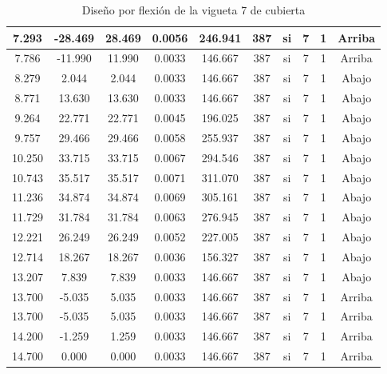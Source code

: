 \begin{table}[H]
{\begin{tabular}{|c|c|c|c|c|c|c|c|c|c|}
    \hline
    7.293 & -28.469 & 28.469 & 0.0056 & 246.941 & 387 & si  & 7   & 1   & Arriba \bigstrut\\
    \hline
    7.786 & -11.990 & 11.990 & 0.0033 & 146.667 & 387 & si  & 7   & 1   & Arriba \bigstrut\\
    \hline
    8.279 & 2.044 & 2.044 & 0.0033 & 146.667 & 387 & si  & 7   & 1   & Abajo \bigstrut\\
    \hline
    8.771 & 13.630 & 13.630 & 0.0033 & 146.667 & 387 & si  & 7   & 1   & Abajo \bigstrut\\
    \hline
    9.264 & 22.771 & 22.771 & 0.0045 & 196.025 & 387 & si  & 7   & 1   & Abajo \bigstrut\\
    \hline
    9.757 & 29.466 & 29.466 & 0.0058 & 255.937 & 387 & si  & 7   & 1   & Abajo \bigstrut\\
    \hline
    10.250 & 33.715 & 33.715 & 0.0067 & 294.546 & 387 & si  & 7   & 1   & Abajo \bigstrut\\
    \hline
    10.743 & 35.517 & 35.517 & 0.0071 & 311.070 & 387 & si  & 7   & 1   & Abajo \bigstrut\\
    \hline
    11.236 & 34.874 & 34.874 & 0.0069 & 305.161 & 387 & si  & 7   & 1   & Abajo \bigstrut\\
    \hline
    11.729 & 31.784 & 31.784 & 0.0063 & 276.945 & 387 & si  & 7   & 1   & Abajo \bigstrut\\
    \hline
    12.221 & 26.249 & 26.249 & 0.0052 & 227.005 & 387 & si  & 7   & 1   & Abajo \bigstrut\\
    \hline
    12.714 & 18.267 & 18.267 & 0.0036 & 156.327 & 387 & si  & 7   & 1   & Abajo \bigstrut\\
    \hline
    13.207 & 7.839 & 7.839 & 0.0033 & 146.667 & 387 & si  & 7   & 1   & Abajo \bigstrut\\
    \hline
    13.700 & -5.035 & 5.035 & 0.0033 & 146.667 & 387 & si  & 7   & 1   & Arriba \bigstrut\\
    \hline
    13.700 & -5.035 & 5.035 & 0.0033 & 146.667 & 387 & si  & 7   & 1   & Arriba \bigstrut\\
    \hline
    14.200 & -1.259 & 1.259 & 0.0033 & 146.667 & 387 & si  & 7   & 1   & Arriba \bigstrut\\
    \hline
    14.700 & 0.000 & 0.000 & 0.0033 & 146.667 & 387 & si  & 7   & 1   & Arriba \bigstrut\\
    \hline
 
    \end{tabular}%
   
}%
      \caption{Diseño por flexión de la vigueta 7 de cubierta}
  \label{tab:F VT7 CUB}%
\end{table}%
